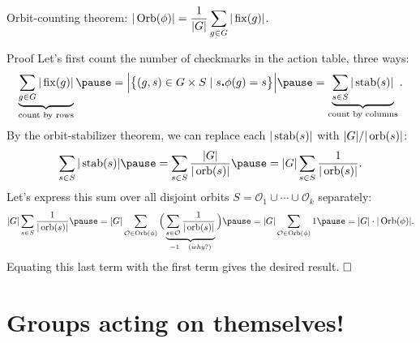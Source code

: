 \documentclass[8pt]{beamer}
\newcommand{\Pause}{\pause}      %
\begin{document}

\begin{frame}{Orbit-counting theorem:
    $\displaystyle|\operatorname{Orb}(\phi)|=\frac{1}{|G|}\sum\limits_{g\in G}|\operatorname{fix}(g)|$.} 
  
  \begin{exampleblock}{Proof} \Pause
    Let's first count the number of checkmarks in the action table, three ways: 
    \[
    \underbrace{\sum_{g\in G}|\fix(g)|}_{\text{count by rows}}\Pause
    =\Big|\big\{(g,s)\in G\times S\mid s\Dot\phi(g)=s\big\}\Big|
    \Pause=\underbrace{\sum_{s\in S}|\stab(s)|}_{\text{count by columns}}.
    \]
    \pause By the orbit-stabilizer theorem, we can replace each
    $|\operatorname{stab}(s)|$ with $|G|/|\operatorname{orb}(s)|$:
    \[
    \sum_{s\in S}|\stab(s)|\pause=\sum_{s\in S}\frac{|G|}{|\orb(s)|}
    \pause=|G|\sum_{s\in S}\frac{1}{|\orb(s)|}.
    \]
    \pause Let's express this sum over all disjoint orbits
    $S=\mathcal{O}_1\cup\cdots\cup\mathcal{O}_k$ separately:
    \[
    |G|\sum_{s\in S}\frac{1}{|\orb(s)|}
    \pause=|G|\sum_{\mathcal{O}\in\Orb(\phi)}\Big(
    \underbrace{\sum_{s\in\mathcal{O}}\frac{1}{|\orb(s)|}}_{=1\quad\text(why?)}\Big)
    \pause=|G|\sum_{\mathcal{O}\in\Orb(\phi)}1\pause=|G|\cdot|\Orb(\phi)|.
    \]
    \pause Equating this last term with the first term gives the desired
    result. $\hfill\Box$    
  \end{exampleblock}
  
\end{frame}


\section{Groups acting on themselves!}

\end{document}
